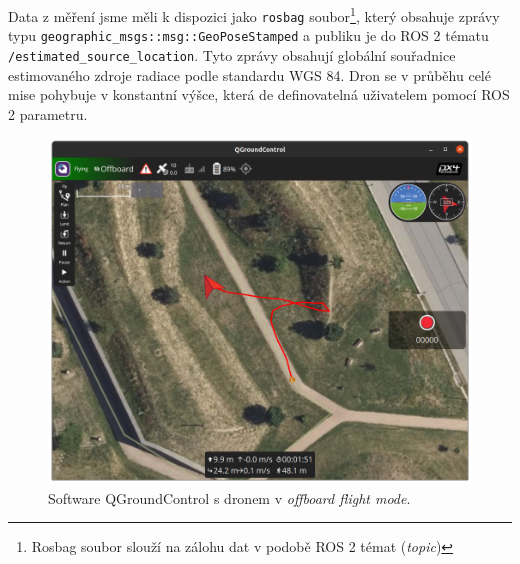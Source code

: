 Data z měření jsme měli k dispozici jako \texttt{rosbag} soubor\footnote{Rosbag soubor slouží na zálohu dat v podobě ROS 2 témat (\textit{topic})}, který obsahuje zprávy typu \texttt{geographic\_msgs::msg::GeoPoseStamped} a publiku je do ROS 2 tématu \texttt{/estimated\_source\_location}. Tyto zprávy obsahují globální souřadnice estimovaného zdroje radiace podle standardu WGS 84. Dron se v průběhu celé mise pohybuje v konstantní výšce, která de definovatelná uživatelem pomocí ROS 2 parametru.

\begin{figure}[!ht]
  \begin{center}
    \includegraphics[scale=0.35]{obrazky/MISESL1}
  \end{center}
  \caption[Software QGroundControl s dronem v \textit{offboard flight mode}]{Software QGroundControl s dronem v \textit{offboard flight mode}.}
  \label{fig:SIM3QGC}
\end{figure}

